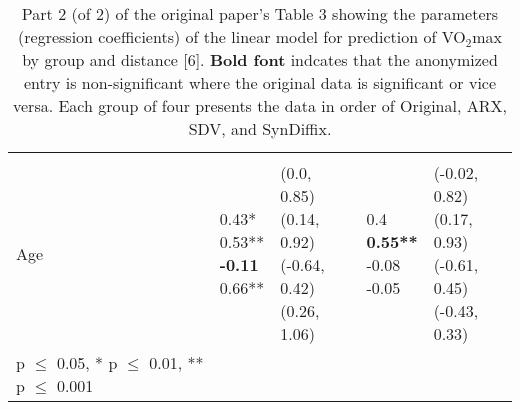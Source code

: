 \documentclass[10pt]{article}
\newcommand{\mycite}[1]{[#1]}
\begin{document}
\begin{table}
\begin{center}
\begin{small}
\begin{tabular}{lllll}
& & & & \\ 
\quad Age    &  \makecell[l]{\textnormal{0.43*\phantom{**}} \\\textnormal{0.53**\phantom{*}} \\\textbf{-0.11\phantom{***}} \\\textnormal{0.66**\phantom{*}} \\}   &  \makecell[l]{\textnormal{(0.0, 0.85)} \\\textnormal{(0.14, 0.92)} \\\textnormal{(-0.64, 0.42)} \\\textnormal{(0.26, 1.06)} \\}   &  \makecell[l]{\textnormal{0.4\phantom{***}} \\\textbf{0.55**\phantom{*}} \\\textnormal{-0.08\phantom{***}} \\\textnormal{-0.05\phantom{***}} \\}   &  \makecell[l]{\textnormal{(-0.02, 0.82)} \\\textnormal{(0.17, 0.93)} \\\textnormal{(-0.61, 0.45)} \\\textnormal{(-0.43, 0.33)} \\} \\ 

      \bottomrule
      {\footnotesize * p $\leq$ 0.05, \quad** p $\leq$ 0.01, \quad*** p $\leq$ 0.001}
      \end{tabular}
      \end{small}
      \caption{Part 2 (of 2) of the original paper's Table 3 showing the parameters (regression coefficients) of the linear model for prediction of VO$_2$max by group and distance \mycite{6}. \textbf{Bold font} indcates that the anonymized entry is non-significant where the original data is significant or vice versa. Each group of four presents the data in order of Original, ARX, SDV, and SynDiffix. 
      }
      \label{tab:table3b}
      \end{center}
      \end{table}
      \setlength{\fboxsep}{3pt}
    


\end{document}
